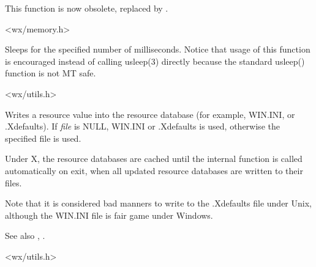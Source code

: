 This function is now obsolete, replaced by .


<wx/memory.h>

\label{wxusleep}


Sleeps for the specified number of milliseconds. Notice that usage of this
function is encouraged instead of calling usleep(3) directly because the
standard usleep() function is not MT safe.


<wx/utils.h>

\label{wxwriteresource}





Writes a resource value into the resource database (for example, WIN.INI, or
.Xdefaults). If {\it file} is NULL, WIN.INI or .Xdefaults is used,
otherwise the specified file is used.

Under X, the resource databases are cached until the internal function
 is called automatically on exit, when
all updated resource databases are written to their files.

Note that it is considered bad manners to write to the .Xdefaults
file under Unix, although the WIN.INI file is fair game under Windows.

See also , .


<wx/utils.h>

\label{wxyield}

